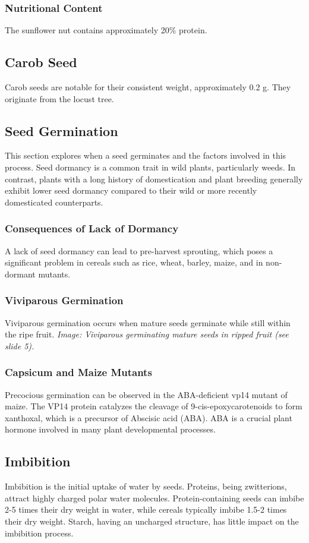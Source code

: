 \subsubsection{Nutritional Content} 
The sunflower nut contains approximately 20\% protein.

\subsection{Carob Seed} 
Carob seeds are notable for their consistent weight, approximately 0.2 g. They originate from the locust tree.

\subsection{Seed Germination} 
This section explores when a seed germinates and the factors involved in this process. Seed dormancy is a common trait in wild plants, particularly weeds. In contrast, plants with a long history of domestication and plant breeding generally exhibit lower seed dormancy compared to their wild or more recently domesticated counterparts.

\subsubsection{Consequences of Lack of Dormancy} 
A lack of seed dormancy can lead to pre-harvest sprouting, which poses a significant problem in cereals such as rice, wheat, barley, maize, and in non-dormant mutants.

\subsubsection{Viviparous Germination} 
Viviparous germination occurs when mature seeds germinate while still within the ripe fruit. \textit{Image: Viviparous germinating mature seeds in ripped fruit (see slide 5).}

\subsubsection{Capsicum and Maize Mutants} 
Precocious germination can be observed in the ABA-deficient vp14 mutant of maize. The VP14 protein catalyzes the cleavage of 9-cis-epoxycarotenoids to form xanthoxal, which is a precursor of Abscisic acid (ABA). ABA is a crucial plant hormone involved in many plant developmental processes.

\subsection{Imbibition} 
Imbibition is the initial uptake of water by seeds. Proteins, being zwitterions, attract highly charged polar water molecules. Protein-containing seeds can imbibe 2-5 times their dry weight in water, while cereals typically imbibe 1.5-2 times their dry weight. Starch, having an uncharged structure, has little impact on the imbibition process.

